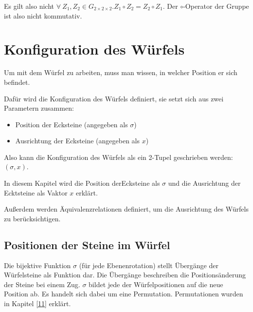 \documentclass[12pt,a4paper, usenames, dvipsnames]{article}
\newcommand{\Gtwo}{\ensuremath{G_{2\times 2\times 2}}}
\begin{document}
Es gilt also nicht $\forall \  Z_1, Z_2 \in \Gtwo. Z_1 \circ Z_2 = Z_2 \circ Z_1$. Der $\circ$-Operator der Gruppe ist also nicht kommutativ. 

%
%
%
%
%
%
%
%
%
%
%
%
%
%
%
%
%
%
%
%
\newpage

\section{Konfiguration des Würfels}

\label{26}
Um mit dem Würfel zu arbeiten, muss man wissen, in welcher Position er sich befindet.

Dafür wird die Konfiguration des Würfels definiert, sie setzt sich aus zwei Parametern zusammen: 
\begin{itemize}
\item Position der Ecksteine (angegeben als $\sigma$)
\item Ausrichtung der Ecksteine (angegeben als $x$)
\end{itemize}
Also kann die Konfiguration des Würfels als ein 2-Tupel geschrieben werden: $(\sigma, x)$.


In diesem Kapitel wird die Position derEcksteine als $\sigma$ und die Ausrichtung der Ecktsteine als Vaktor $x$ erklärt. 

Außerdem werden Äquivalenzrelationen definiert, um die Ausrichtung des Würfels zu berücksichtigen.

%
%
%
%
%
%
%
%
%
%
%
%
%
%
%
%
%
%
%
%
\subsection*{Positionen der Steine im Würfel} 

Die bijektive Funktion $\sigma$ (für jede Ebenenrotation) stellt Übergänge der Würfelsteine als Funktion dar. Die Übergänge beschreiben die Positionsänderung der Steine bei einem Zug. $\sigma$ bildet jede der Würfelpositionen auf die neue Position ab. Es handelt sich dabei um eine Permutation. Permutationen wurden in Kapitel \ref{11} erklärt. 
\end{document}
